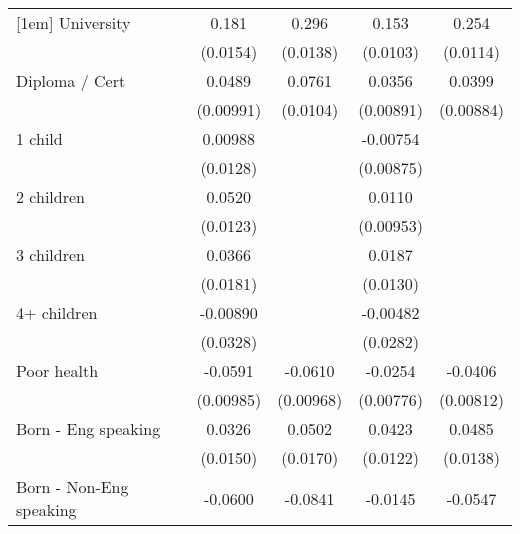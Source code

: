 {\begin{tabular}{l*{4}{c}}
[1em]
University          &       0.181\sym{***}&       0.296\sym{***}&       0.153\sym{***}&       0.254\sym{***}\\
                    &    (0.0154)         &    (0.0138)         &    (0.0103)         &    (0.0114)         \\
[1em]
Diploma / Cert      &      0.0489\sym{***}&      0.0761\sym{***}&      0.0356\sym{***}&      0.0399\sym{***}\\
                    &   (0.00991)         &    (0.0104)         &   (0.00891)         &   (0.00884)         \\
[1em]
1 child             &     0.00988         &                     &    -0.00754         &                     \\
                    &    (0.0128)         &                     &   (0.00875)         &                     \\
[1em]
2 children          &      0.0520\sym{***}&                     &      0.0110         &                     \\
                    &    (0.0123)         &                     &   (0.00953)         &                     \\
[1em]
3 children          &      0.0366\sym{*}  &                     &      0.0187         &                     \\
                    &    (0.0181)         &                     &    (0.0130)         &                     \\
[1em]
4+ children         &    -0.00890         &                     &    -0.00482         &                     \\
                    &    (0.0328)         &                     &    (0.0282)         &                     \\
[1em]
Poor health         &     -0.0591\sym{***}&     -0.0610\sym{***}&     -0.0254\sym{**} &     -0.0406\sym{***}\\
                    &   (0.00985)         &   (0.00968)         &   (0.00776)         &   (0.00812)         \\
[1em]
Born - Eng speaking &      0.0326\sym{*}  &      0.0502\sym{**} &      0.0423\sym{***}&      0.0485\sym{***}\\
                    &    (0.0150)         &    (0.0170)         &    (0.0122)         &    (0.0138)         \\
[1em]
Born - Non-Eng speaking&     -0.0600\sym{***}&     -0.0841\sym{***}&     -0.0145         &     -0.0547\sym{***}\\

\end{tabular}}
